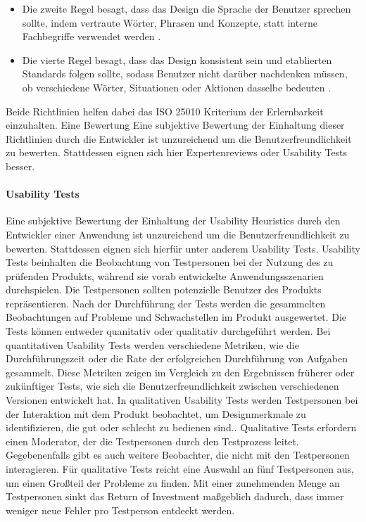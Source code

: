 \begin{itemize}
    \item Die zweite Regel besagt, dass das Design die Sprache der Benutzer sprechen sollte, indem vertraute Wörter, Phrasen und Konzepte, statt interne Fachbegriffe verwendet werden \cite[Regel 2]{Nielsen.1994}.
    \item Die vierte Regel besagt, dass das Design konsistent sein und etablierten Standards folgen sollte, sodass Benutzer nicht darüber nachdenken müssen, ob verschiedene Wörter, Situationen oder Aktionen dasselbe bedeuten \cite[Regel 4]{Nielsen.1994}.
\end{itemize}

Beide Richtlinien helfen dabei das ISO 25010 Kriterium der Erlernbarkeit einzuhalten. Eine Bewertung 
Eine subjektive Bewertung der Einhaltung dieser Richtlinien durch die Entwickler ist unzureichend um die Benutzerfreundlichkeit zu bewerten. Stattdessen eignen sich hier Expertenreviews oder Usability Tests besser.

\paragraph{Usability Tests}
Eine subjektive Bewertung der Einhaltung der Usability Heuristics durch den Entwickler einer Anwendung ist unzureichend um die Benutzerfreundlichkeit zu bewerten. Stattdessen eignen sich hierfür unter anderem Usability Tests. Usability Tests beinhalten die Beobachtung von Testpersonen bei der Nutzung des zu prüfenden Produkts, während sie vorab entwickelte Anwendungsszenarien durchspielen. Die Testpersonen sollten potenzielle Benutzer des Produkts repräsentieren.\cite[S.~22]{Dumas.1999} Nach der Durchführung der Tests werden die gesammelten Beobachtungen auf Probleme und Schwachstellen im Produkt ausgewertet. Die Tests können entweder quanitativ oder qualitativ durchgeführt werden. Bei quantitativen Usability Tests werden verschiedene Metriken, wie die Durchführungszeit oder die Rate der erfolgreichen Durchführung von Aufgaben gesammelt. Diese Metriken zeigen im Vergleich zu den Ergebnissen früherer oder zukünftiger Tests, wie sich die Benutzerfreundlichkeit zwischen verschiedenen Versionen entwickelt hat. In qualitativen Usability Tests werden Testpersonen bei der Interaktion mit dem Produkt beobachtet, um Designmerkmale zu identifizieren, die gut oder schlecht zu bedienen sind.\cite{Budiu.2017}. Qualitative Tests erfordern einen Moderator, der die Testpersonen durch den Testprozess leitet. Gegebenenfalls gibt es auch weitere Beobachter, die nicht mit den Testpersonen interagieren.\cite{Moran.2019} Für qualitative Tests reicht eine Auswahl an fünf Testpersonen aus, um einen Großteil der Probleme zu finden. Mit einer zunehmenden Menge an Testpersonen sinkt das Return of Investment maßgeblich dadurch, dass immer weniger neue Fehler pro Testperson entdeckt werden.\cite{Nielsen.2012}

